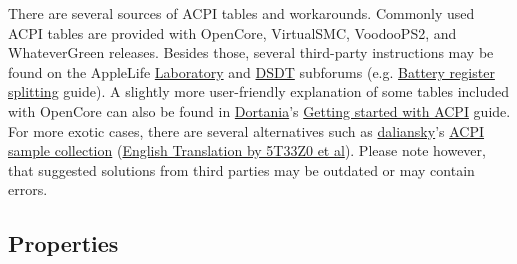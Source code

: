 \documentclass[]{article}
\begin{document}
There are several sources of ACPI tables and workarounds. Commonly used
ACPI tables are provided with OpenCore, VirtualSMC, VoodooPS2, and WhateverGreen
releases. Besides those, several third-party instructions may be found on
the AppleLife \href{https://applelife.ru/forums/xakintosh.67}{Laboratory}
and \href{https://applelife.ru/forums/dsdt.129}{DSDT} subforums
(e.g. \href{https://applelife.ru/posts/498967}{Battery register splitting} guide).
A slightly more user-friendly explanation of some tables included with OpenCore
can also be found in \href{https://dortania.github.io}{Dortania}'s
\href{https://dortania.github.io/Getting-Started-With-ACPI}{Getting started with ACPI} guide.
For more exotic cases, there are several alternatives such as
\href{https://github.com/daliansky}{daliansky}'s
\href{https://github.com/daliansky/OC-little}{ACPI sample collection}
(\href{https://github.com/5T33Z0/OC-Little-Translated}{English Translation by 5T33Z0 et al}).
Please note however, that suggested solutions from third parties may be outdated or may contain errors.

\subsection{Properties}\label{acpiprops}
\end{document}
